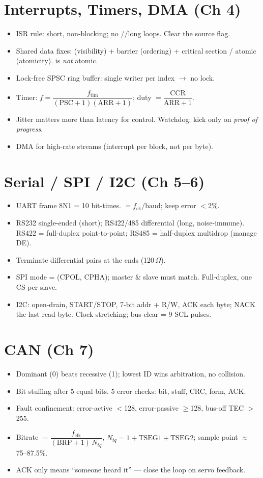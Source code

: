 \section*{Interrupts, Timers, DMA (Ch 4)}
\begin{itemize}
\item ISR rule: short, non-blocking; no //long loops.
  Clear the source flag.
\item Shared data fixes:  (visibility) + barrier (ordering) +
  critical section / atomic (atomicity).  is \emph{not} atomic.
\item Lock-free SPSC ring buffer: single writer per index $\rightarrow$ no lock.
\item Timer: $f=\dfrac{f_{\text{tim}}}{(\text{PSC}+1)(\text{ARR}+1)}$;\quad
  duty $=\dfrac{\text{CCR}}{\text{ARR}+1}$.
\item Jitter matters more than latency for control. Watchdog: kick only on
  \emph{proof of progress}.
\item DMA for high-rate streams (interrupt per block, not per byte).
\end{itemize}

\section*{Serial / SPI / I2C (Ch 5--6)}
\begin{itemize}
\item UART frame 8N1 = 10 bit-times. $=f_{\text{ck}}/\text{baud}$;
  keep error $<$2\%.
\item RS232 single-ended (short); RS422/485 differential (long, noise-immune).
  RS422 = full-duplex point-to-point; RS485 = half-duplex multidrop (manage
  DE).
\item Terminate differential pairs at the ends (120\,$\Omega$).
\item SPI mode = (CPOL, CPHA); master \& slave must match. Full-duplex, one CS
  per slave.
\item I2C: open-drain, START/STOP, 7-bit addr + R/W, ACK each byte; NACK the
  last read byte. Clock stretching; bus-clear = 9 SCL pulses.
\end{itemize}

\section*{CAN (Ch 7)}
\begin{itemize}
\item Dominant (0) beats recessive (1); lowest ID wins arbitration, no
  collision.
\item Bit stuffing after 5 equal bits. 5 error checks: bit, stuff, CRC, form,
  ACK.
\item Fault confinement: error-active $<$128, error-passive $\ge$128, bus-off
  TEC $>$255.
\item Bitrate $=\dfrac{f_{\text{clk}}}{(\text{BRP}+1)\,N_{tq}}$,
  $N_{tq}=1+\text{TSEG1}+\text{TSEG2}$; sample point $\approx$ 75--87.5\%.
\item ACK only means ``someone heard it'' --- close the loop on servo feedback.
\end{itemize}

